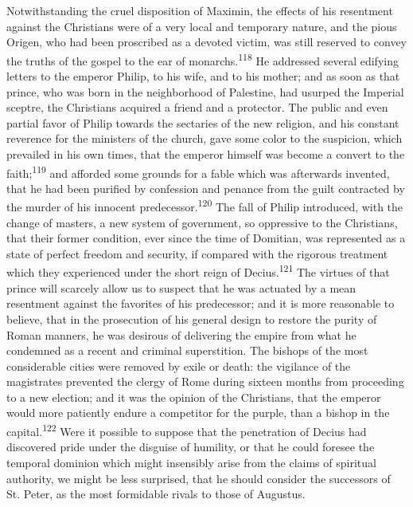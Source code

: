 
Notwithstanding the cruel disposition of Maximin, the effects of
his resentment against the Christians were of a very local and
temporary nature, and the pious Origen, who had been proscribed
as a devoted victim, was still reserved to convey the truths of
the gospel to the ear of monarchs.\textsuperscript{118} He addressed several
edifying letters to the emperor Philip, to his wife, and to his
mother; and as soon as that prince, who was born in the
neighborhood of Palestine, had usurped the Imperial sceptre, the
Christians acquired a friend and a protector. The public and even
partial favor of Philip towards the sectaries of the new
religion, and his constant reverence for the ministers of the
church, gave some color to the suspicion, which prevailed in his
own times, that the emperor himself was become a convert to the
faith;\textsuperscript{119} and afforded some grounds for a fable which was
afterwards invented, that he had been purified by confession and
penance from the guilt contracted by the murder of his innocent
predecessor.\textsuperscript{120} The fall of Philip introduced, with the change
of masters, a new system of government, so oppressive to the
Christians, that their former condition, ever since the time of
Domitian, was represented as a state of perfect freedom and
security, if compared with the rigorous treatment which they
experienced under the short reign of Decius.\textsuperscript{121} The virtues of
that prince will scarcely allow us to suspect that he was
actuated by a mean resentment against the favorites of his
predecessor; and it is more reasonable to believe, that in the
prosecution of his general design to restore the purity of Roman
manners, he was desirous of delivering the empire from what he
condemned as a recent and criminal superstition. The bishops of
the most considerable cities were removed by exile or death: the
vigilance of the magistrates prevented the clergy of Rome during
sixteen months from proceeding to a new election; and it was the
opinion of the Christians, that the emperor would more patiently
endure a competitor for the purple, than a bishop in the capital.\textsuperscript{122}
Were it possible to suppose that the penetration of Decius
had discovered pride under the disguise of humility, or that he
could foresee the temporal dominion which might insensibly arise
from the claims of spiritual authority, we might be less
surprised, that he should consider the successors of St. Peter,
as the most formidable rivals to those of Augustus.

